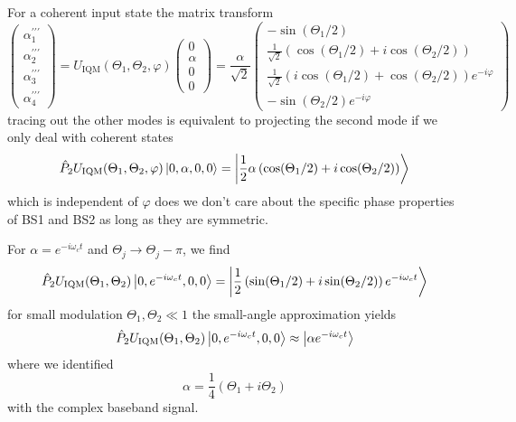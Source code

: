 For a coherent input state the matrix transform 
\begin{equation}
	\begin{pmatrix}
		\alpha_1^{\prime\prime\prime} \\
		\alpha_2^{\prime\prime\prime} \\
		\alpha_3^{\prime\prime\prime} \\
		\alpha_4^{\prime\prime\prime}
	\end{pmatrix}
	=
	U_\text{IQM}(\Theta_1,\Theta_2,\varphi)
	\begin{pmatrix}
		0 \\
		\alpha \\
		0 \\ 
		0
	\end{pmatrix}
	=
	\frac{\alpha}{\sqrt{2}}
	\begin{pmatrix}
		-\sin(\Theta_1/2) \\
		\frac{1}{\sqrt{2}}\left(\cos(\Theta_1/2)+i\cos(\Theta_2/2)\right) \\
		\frac{1}{\sqrt{2}}\left(i\cos(\Theta_1/2)+\cos(\Theta_2/2)\right)e^{-i\varphi} \\
		-\sin(\Theta_2/2)e^{-i\varphi}
	\end{pmatrix}
\end{equation}
tracing out the other modes is equivalent to projecting the second mode if we only deal with coherent states
\begin{equation}
	\hat{P}_2
	U_\text{IQM}(\Theta_1,\Theta_2,\varphi)
	\ket{0,\alpha,0,0}
	=
	\ket{\frac{1}{2}\alpha\left(\cos(\Theta_1/2)+i\cos(\Theta_2/2)\right)}
\end{equation}
which is independent of $\varphi$ does we don't care about the specific phase properties of BS1 and BS2 as long as they are symmetric.

For $\alpha=e^{-i\omega_ct}$ and $\Theta_j\to\Theta_j-\pi$, we find
\begin{equation}
	\hat{P}_2
	U_\text{IQM}(\Theta_1,\Theta_2)
	\ket{0,e^{-i\omega_ct},0,0}
	=
	\ket{\frac{1}{2}\left(\sin(\Theta_1/2)+i\sin(\Theta_2/2)\right)e^{-i\omega_ct}}
\end{equation}
for small modulation $\Theta_1,\Theta_2\ll1$ the small-angle approximation yields
\begin{equation}
	\hat{P}_2
	U_\text{IQM}(\Theta_1,\Theta_2)
	\ket{0,e^{-i\omega_ct},0,0}
	\approx
	\ket{\alpha e^{-i\omega_ct}}
\end{equation}
where we identified
\begin{equation}
	\alpha
	=
	\frac{1}{4}
	\left(\Theta_1+i\Theta_2\right)
\end{equation}
with the complex baseband signal.

